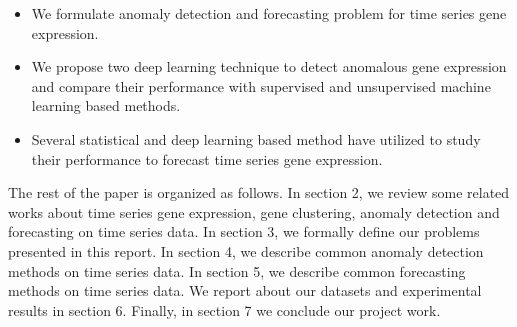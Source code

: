 \begin{itemize}
    \item We formulate anomaly detection and forecasting problem for time series gene expression.
    \item We propose two deep learning technique to detect anomalous gene expression and compare their performance with supervised and unsupervised machine learning based methods.
    \item Several statistical and deep learning based method have utilized to study their performance to forecast time series gene expression. 
\end{itemize}

The rest of the paper is organized as follows. In section 2, we review some related works about time series gene expression, gene clustering, anomaly detection and forecasting on time series data. In section 3, we formally define our problems presented in this report. In section 4, we describe common anomaly detection methods on time series data.  In section 5, we describe common forecasting methods on time series data. We report about our datasets and experimental results in section 6. Finally, in section 7 we conclude our project work.  
